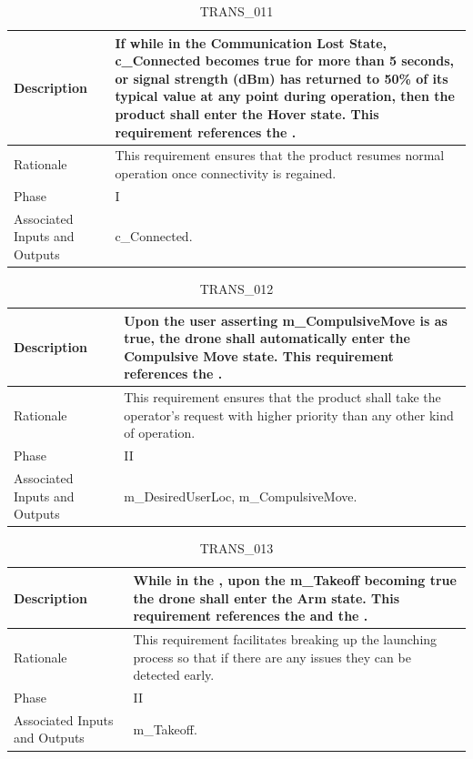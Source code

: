 \documentclass{article}
\begin{document}
\begin{table}[!h]
\begin{center}
\caption {TRANS\_011} 
\label{TRANS_011}
\begin{tabular}{ | m{3cm} | m{11cm} | }
\hline
Description & If while in the Communication Lost State, c\_Connected becomes true for more than 5 seconds, or signal strength (dBm) has returned to 50\% of its typical value at any point during operation, then the product shall enter the Hover state. This requirement references the \nameref{Communication Lost State}. \\
\hline
Rationale & This requirement ensures that the product resumes normal operation once connectivity is regained. \\
\hline
Phase & I \\
\hline
Associated Inputs and Outputs & c\_Connected. \\
\hline
\end{tabular}
\end{center}
\end{table}

\begin{table}[!h]
\begin{center}
\caption {TRANS\_012} 
\label{TRANS_012}
\begin{tabular}{ | m{3cm} | m{11cm} | }
\hline
Description & Upon the user asserting m\_CompulsiveMove is as true, the drone shall automatically enter the Compulsive Move state. This requirement references the \nameref{Compulsive Move State}. \\
\hline
Rationale & This requirement ensures that the product shall take the operator's request with higher priority than any other kind of operation. \\
\hline
Phase & II \\
\hline
Associated Inputs and Outputs & m\_DesiredUserLoc, m\_CompulsiveMove. \\
\hline
\end{tabular}
\end{center}
\end{table}

\begin{table}[!h]
\begin{center}
\caption {TRANS\_013} 
\label{TRANS_013}
\begin{tabular}{ | m{3cm} | m{11cm} | }
\hline
Description & While in the \nameref{Arm State}, upon the m\_Takeoff becoming true the drone shall enter the Arm state. This requirement references the \nameref{Arm State} and the \nameref{Takeoff State}. \\
\hline
Rationale & This requirement facilitates breaking up the launching process so that if there are any issues they can be detected early.  \\
\hline
Phase & II \\
\hline
Associated Inputs and Outputs & m\_Takeoff. \\
\hline
\end{tabular}
\end{center}
\end{table}
\end{document}
